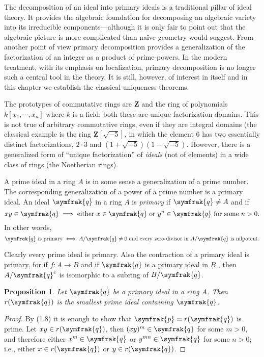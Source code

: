 \documentclass{standalone}
\newtheorem{proposition}[theorem]{Proposition}
\theoremstyle{definition}
\theoremstyle{remark}
\begin{document}
The decomposition of an ideal into primary ideals is a traditional pillar of
ideal theory. It provides the algebraic foundation for decomposing an algebraic
variety into its irreducible components---although it is only fair to point out
that the algebraic picture is more complicated than na\"{i}ve geometry would
suggest. From another point of view primary decomposition provides a
generalization of the factorization of an integer as a product of prime-powers.
In the modern treatment, with its emphasis on localization, primary
decomposition is no longer such a central tool in the theory. It is still,
however, of interest in itself and in this chapter we establish the classical
uniqueness theorems.

The prototypes of commutative rings are $\mathbf{Z}$ and the ring of polynomials
 $k[x_1,\cdots,x_n]$ where $k$ is a field; both these are unique factorization
 domains. This is not true of arbitrary commutative rings, even if they are
 integral domains (the classical example is the ring $\mathbf{Z}[\sqrt{-5}]$, in
 which the element 6 has two essentially distinct factorizations, $2\cdot 3$ and
 $(1+\sqrt{-5})(1-\sqrt{-5})$. However, there is a generalized form of ``unique
 factorization'' of \textit{ideals} (not of elements) in a wide class of rings
 (the Noetherian rings).

A prime ideal in a ring $A$ is in some sense a generalization of a prime number.
The corresponding generalization of a power of a prime number is a primary
ideal. An ideal $\symfrak{q}$ in a ring $A$ is \textit{primary} if
$\symfrak{q}\neq A$ and if
\[
  xy\in\symfrak{q}\implies\text{either }x\in\symfrak{q}\text{ or
  }y^n\in\symfrak{q}\text{ for some }n>0.
\]
In other words,
\[
\symfrak{q}\text{ is primary}\iff A/\symfrak{q}\ne 0 \text{ and every
  zero-divisor in }A/\symfrak{q}\text{ is nilpotent}.
\]

Clearly every prime ideal is primary. Also the contraction of a primary ideal is
primary, for if $f:A\to B$ and if $\symfrak{q}$ is a primary ideal in $B$ , then
$A/\symfrak{q}^c$ is isomorphic to a subring of $B/\symfrak{q}$.
\begin{proposition}
  Let $\symfrak{q}$ be a primary ideal in a ring $A$. Then $r(\symfrak{q})$ is
  the smallest prime ideal containing $\symfrak{q}$.
\end{proposition}
\begin{proof}
  By (1.8) it is enough to show that $\symfrak{p}=r(\symfrak{q})$ is prime. Let
  $xy\in r(\symfrak{q})$, then $(xy)^m\in \symfrak{q}$ for some $m>0$, and
  therefore either $x^m\in \symfrak{q}$ or $y^{mn}\in \symfrak{q}$ for some
  $n>0$; i.e., either $x\in r(\symfrak{q})$ or $y \in r(\symfrak{q})$.
\end{proof}
\end{document}
